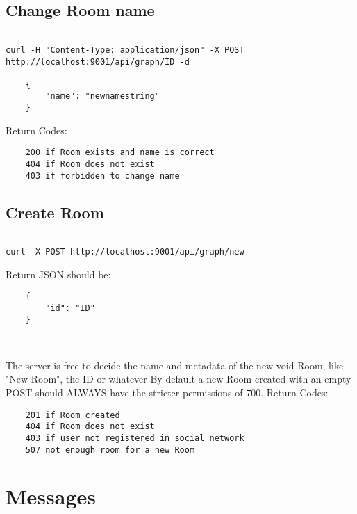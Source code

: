 \documentclass[12pt]{article}
\begin{document}
\filbreak
\subsection{Change Room name}

\begin{verbatim}

curl -H "Content-Type: application/json" -X POST http://localhost:9001/api/graph/ID -d 

    { 
        "name": "newnamestring" 
    }

\end{verbatim}

Return Codes:
\begin{verbatim}
    200 if Room exists and name is correct
    404 if Room does not exist
    403 if forbidden to change name
\end{verbatim}




\filbreak
\subsection{Create Room}

\begin{verbatim}

curl -X POST http://localhost:9001/api/graph/new

\end{verbatim}

Return JSON should be:

\begin{verbatim}
    { 
        "id": "ID" 
    }



\end{verbatim}
The server is free to decide the name and metadata of the new void Room, like "New Room", the ID or whatever 
\newline
By default a new Room created with an empty POST should ALWAYS have the stricter permissions of 700.
\newline
Return Codes:

\begin{verbatim}
    201 if Room created
    404 if Room does not exist
    403 if user not registered in social network
    507 not enough room for a new Room
\end{verbatim}


\newpage
\section{Messages}
\end{document}
